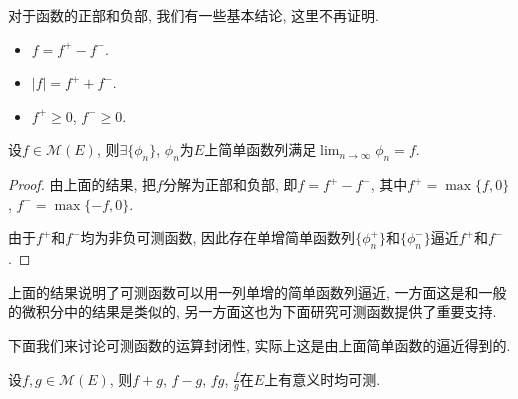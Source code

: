 \documentclass[theorem=false,mathfont=none,openany,sub3section]{easybook}
\begin{document}
\begin{remark}
  对于函数的正部和负部, 我们有一些基本结论, 这里不再证明.\par
  \begin{itemize}
    \item $f=f^+-f^-$.
    \item $|f|=f^++f^-$.
    \item $f^+\geqslant 0$, $f^-\geqslant 0$.
  \end{itemize}
\end{remark}

\begin{corollary}
  设$f\in \mathcal{M}(E)$, 则$\exists \{\phi_n\}$, $\phi_n$为$E$上简单函数列满足$\lim_{n \to \infty} \phi_n = f$.\par
\end{corollary}

\begin{proof}
  由上面的结果, 把$f$分解为正部和负部, 即$f=f^+-f^-$, 其中$f^+=\max\{f,0\}$, $f^-=\max\{-f,0\}$.\par
  由于$f^+$和$f^-$均为非负可测函数, 因此存在单增简单函数列$\{\phi_n^{+}\}$和$\{\phi_n^{-}\}$逼近$f^+$和$f^-$.\par
\end{proof}

\begin{remark}
  上面的结果说明了可测函数可以用一列单增的简单函数列逼近, 一方面这是和一般的微积分中的结果是类似的, 另一方面这也为下面研究可测函数提供了重要支持.\par
\end{remark}

下面我们来讨论可测函数的运算封闭性, 实际上这是由上面简单函数的逼近得到的.\par

\begin{theorem}
  设$f,g\in \mathcal{M}(E)$, 则$f+g$, $f-g$, $fg$, $\frac{f}{g}$在$E$上有意义时均可测.\par
\end{theorem}
\end{document}
